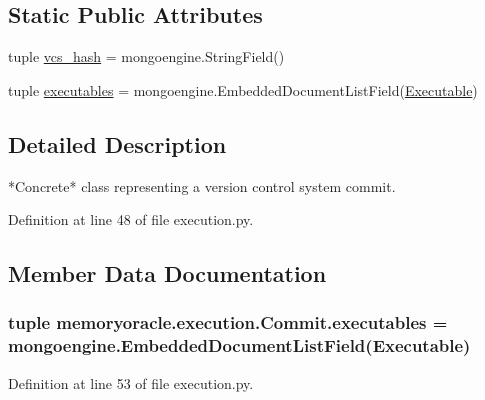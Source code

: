 \subsection*{Static Public Attributes}
\begin{DoxyCompactItemize}
\item 
tuple \hyperlink{classmemoryoracle_1_1execution_1_1Commit_a3ba32127f9f96216379e06d3fb64fd9b}{vcs\+\_\+hash} = mongoengine.\+String\+Field()
\item 
tuple \hyperlink{classmemoryoracle_1_1execution_1_1Commit_aaefe153fdfeaab0bea861905e8e32f5a}{executables} = mongoengine.\+Embedded\+Document\+List\+Field(\hyperlink{classmemoryoracle_1_1execution_1_1Executable}{Executable})
\end{DoxyCompactItemize}


\subsection{Detailed Description}
\begin{DoxyVerb}*Concrete* class representing a version control system commit.
\end{DoxyVerb}
 

Definition at line 48 of file execution.\+py.



\subsection{Member Data Documentation}
\hypertarget{classmemoryoracle_1_1execution_1_1Commit_aaefe153fdfeaab0bea861905e8e32f5a}{}
\subsubsection[{executables}]{\setlength{\rightskip}{0pt plus 5cm}tuple memoryoracle.\+execution.\+Commit.\+executables = mongoengine.\+Embedded\+Document\+List\+Field({\bf Executable})\hspace{0.3cm}{\ttfamily [static]}}\label{classmemoryoracle_1_1execution_1_1Commit_aaefe153fdfeaab0bea861905e8e32f5a}


Definition at line 53 of file execution.\+py.

\hypertarget{classmemoryoracle_1_1execution_1_1Commit_a3ba32127f9f96216379e06d3fb64fd9b}{}
